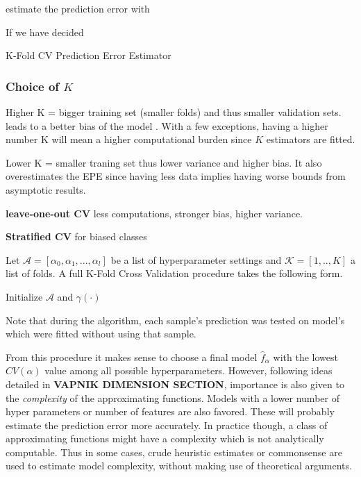  
estimate the prediction error with
 
If we have decided 
 
 
\begin{definition}{K-Fold CV Prediction Error Estimator}
 	
\end{definition}
 
\subsubsection{Choice of $K$} 
 
Higher K = bigger training set (smaller folds) and thus smaller validation sets. leads to a better bias of the model . With a few exceptions, having a higher number K will mean a higher computational burden since $K$ estimators are fitted. 
 
 Lower K = smaller traning set thus lower variance and higher bias. It also overestimates the EPE since having less data implies having worse bounds from asymptotic results. 
 
\textbf{leave-one-out CV}
less computations, stronger bias, higher variance.

\textbf{Stratified CV}
for biased classes
 
 Let $\mathcal{A} = [\alpha_0, \alpha_1,..., \alpha_l   ]$ be a list of hyperparameter settings and  $\mathcal{K} =[1,..,K]$ a list of folds.  A full K-Fold Cross Validation procedure takes the following form.
 
 \begin{algorithm}%
 	\SetAlgoLined
 	Initialize $\mathcal{A}$ and $\gamma(\cdot)$\;
 \caption{K-Fold Cross Validation Estimation Procedure}
\end{algorithm}

Note that during the algorithm, each sample's prediction was tested on model's which were fitted without using that sample. 

From this procedure it makes sense to choose a final  model $\hat{f}_\alpha$ with the lowest $CV(\alpha)$ value among all possible hyperparameters. However, following ideas detailed in \textbf{VAPNIK DIMENSION SECTION}, importance is also given to the \textit{complexity} of the approximating functions. Models with a lower number of hyper parameters or number of features are also favored. These will probably estimate the prediction error more accurately. In practice though, a class of approximating functions might have a complexity which is not analytically computable. Thus in some cases, crude heuristic estimates or commonsense are used to estimate model complexity, without making use of theoretical arguments.

